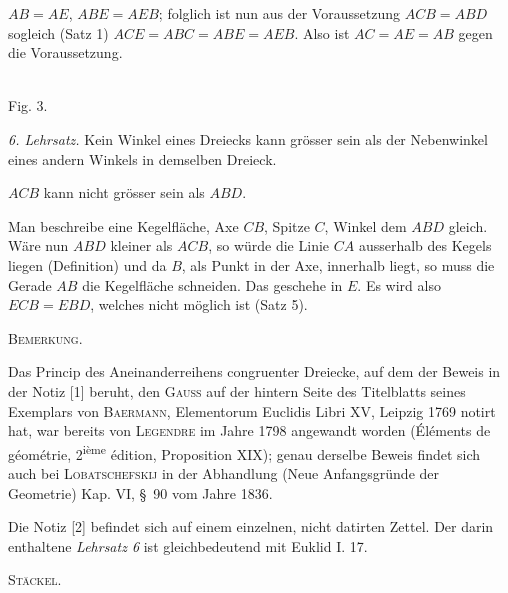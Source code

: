 $AB = AE$, $ABE = AEB$; folglich ist nun aus der Voraussetzung $ACB = ABD$ sogleich
(Satz 1) $ACE = ABC = ABE = AEB$. Also ist $AC = AE = AB$ gegen die Voraussetzung.

\begin{center}
\\[3pt]Fig. 3.
\end{center}

\emph{6. Lehrsatz.} Kein Winkel eines Dreiecks kann grösser sein als der Nebenwinkel
eines andern Winkels in demselben Dreieck.

$ACB$ kann nicht grösser sein als $ABD$.

 Man beschreibe eine Kegelfläche, Axe $CB$, Spitze $C$, Winkel dem $ABD$
gleich. Wäre nun $ABD$ kleiner als $ACB$, so würde die Linie $CA$ ausserhalb des
Kegels liegen (Definition) und da $B$, als Punkt in der Axe, innerhalb liegt, so
muss die Gerade $AB$ die Kegelfläche schneiden. Das geschehe in $E$. Es wird also
$ECB = EBD$, welches nicht möglich ist (Satz 5).


 

\begin{center}

\end{center}

\begin{center}\textsc{Bemerkung.}\end{center}


Das Princip des Aneinanderreihens congruenter Dreiecke, auf dem der Beweis in der
Notiz [1] beruht, den \textsc{Gauss} auf der hintern Seite des Titelblatts seines Exemplars
von \textsc{Baermann}, Elementorum Euclidis Libri XV, Leipzig 1769 notirt hat, war bereits
von \textsc{Legendre} im Jahre 1798 angewandt worden (Éléments de géométrie, 2\textsuperscript{ième} édition,
Proposition XIX); genau derselbe Beweis findet sich auch bei \textsc{Lobatschefskij} in der
Abhandlung  (Neue Anfangsgründe der Geometrie) Kap. VI,
\S\ 90 vom Jahre 1836.

Die Notiz [2] befindet sich auf einem einzelnen, nicht datirten Zettel. Der darin
enthaltene \emph{Lehrsatz 6} ist gleichbedeutend mit Euklid I. 17.

\begin{flushright}\textsc{Stäckel.}\end{flushright}

